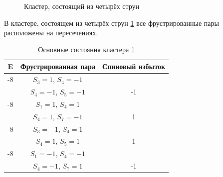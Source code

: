 \documentclass[utf8, babel, sor, jor, amsmath,amssymb, reprint]{elsarticle} %
\begin{document}
\begin{figure}[h]
	\centering
	\caption{Кластер, состоящий из четырёх струн}
	\label{fig:3x3}
\end{figure}

В кластере, состоящем из четырёх струн \ref{fig:3x3} все фрустрированные пары расположены на пересечениях.

\begin{table}[h]
	\centering
	\begin{tabular}{|c|c|c|}
		\hline
		E   &   Фрустрированная пара & Спиновый избыток\\
		\hline
		-8   &  $S_3=1$, $S_4=-1$&\\
		&    $S_4=-1$, $S_5=-1$ & -1\\
		\hline
		-8   &  $S_1=1$, $S_4=1$&\\
		&    $S_4=1$, $S_7=-1$ & 1\\
		\hline
		-8   &  $S_3=-1$, $S_4=1$&\\
			&    $S_4=1$, $S_5=1$& 1\\
		\hline
		-8   &  $S_1=-1$, $S_4=-1$&\\
			&    $S_4=-1$, $S_7=1$& -1\\
		\hline
	\end{tabular}
	\caption{Основные состояния кластера \ref{fig:3x3}}
	\label{tab:gs_3x3}
\end{table} 
\end{document}
